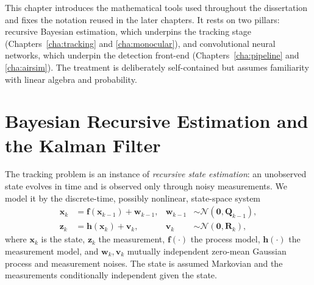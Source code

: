
This chapter introduces the mathematical tools used throughout the dissertation
and fixes the notation reused in the later chapters. It rests on two pillars:
recursive Bayesian estimation, which underpins the tracking stage
(Chapters~\ref{cha:tracking} and \ref{cha:monocular}), and convolutional neural
networks, which underpin the detection front-end (Chapters~\ref{cha:pipeline}
and \ref{cha:airsim}). The treatment is deliberately self-contained but assumes
familiarity with linear algebra and probability.

\section{Bayesian Recursive Estimation and the Kalman Filter}

The tracking problem is an instance of \emph{recursive state estimation}: an
unobserved state evolves in time and is observed only through noisy
measurements. We model it by the discrete-time, possibly nonlinear, state-space
system
\begin{align}
  \bm{x}_k &= \bm{f}(\bm{x}_{k-1}) + \bm{w}_{k-1}, & \bm{w}_{k-1} &\sim \mathcal{N}(\bm{0},\bm{Q}_{k-1}), \label{eq:ss_process}\\
  \bm{z}_k &= \bm{h}(\bm{x}_k) + \bm{v}_k,         & \bm{v}_k     &\sim \mathcal{N}(\bm{0},\bm{R}_k),     \label{eq:ss_meas}
\end{align}
where $\bm{x}_k$ is the state, $\bm{z}_k$ the measurement, $\bm{f}(\cdot)$ the
process model, $\bm{h}(\cdot)$ the measurement model, and $\bm{w}_k,\bm{v}_k$
mutually independent zero-mean Gaussian process and measurement noises. The state
is assumed Markovian and the measurements conditionally independent given the
state.


